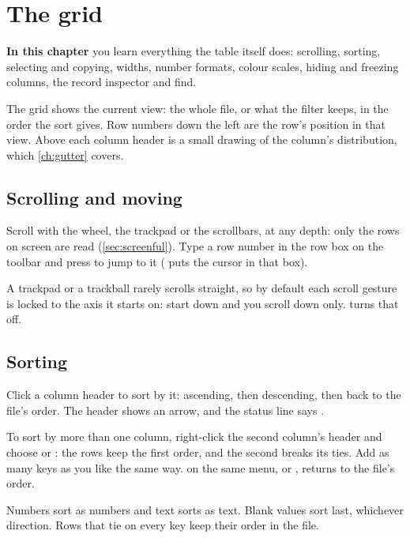 \chapter{The grid}\label{ch:grid}
\begin{goals}
\textbf{In this chapter} you learn everything the table itself does: scrolling, sorting, selecting and
copying, widths, number formats, colour scales, hiding and freezing columns, the record inspector and
find.
\end{goals}

The grid shows the current view: the whole file, or what the filter keeps, in the order the sort gives.
Row numbers down the left are the row's position in that view. Above each column header is a small
drawing of the column's distribution, which \cref{ch:gutter} covers.

\section{Scrolling and moving}\label{sec:scrolling}

Scroll with the wheel, the trackpad or the scrollbars, at any depth: only the rows on screen are read
(\cref{sec:screenful}). Type a row number in the row box on the toolbar and press  to jump to
it ( puts the cursor in that box).

A trackpad or a trackball rarely scrolls straight, so by default each scroll gesture is locked to the
axis it starts on: start down and you scroll down only.  turns that
off.

\section{Sorting}\label{sec:sort}

Click a column header to sort by it: ascending, then descending, then back to the file's order. The
header shows an arrow, and the status line says .

To sort by more than one column, right-click the second column's header and choose  or
: the rows keep the first order, and the second breaks its ties. Add as many keys as you
like the same way.  on the same menu, or , returns to the file's
order.

Numbers sort as numbers and text sorts as text. Blank values sort last, whichever direction. Rows that
tie on every key keep their order in the file.

